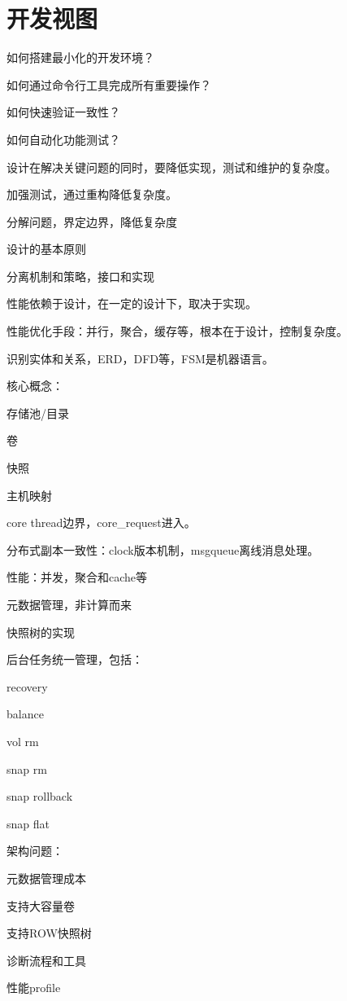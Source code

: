 \chapter{开发视图}

\begin{enumbox}
\item 如何搭建最小化的开发环境？
\item 如何通过命令行工具完成所有重要操作？
\item 如何快速验证一致性？
\item 如何自动化功能测试？
\end{enumbox}

设计在解决关键问题的同时，要降低实现，测试和维护的复杂度。

加强测试，通过重构降低复杂度。

分解问题，界定边界，降低复杂度

设计的基本原则

分离机制和策略，接口和实现

性能依赖于设计，在一定的设计下，取决于实现。

性能优化手段：并行，聚合，缓存等，根本在于设计，控制复杂度。

识别实体和关系，ERD，DFD等，FSM是机器语言。

核心概念：
\begin{compactenum}
\item 存储池/目录
\item 卷
\item 快照
\item 主机映射
\end{compactenum}

core thread边界，core\_request进入。

分布式副本一致性：clock版本机制，msgqueue离线消息处理。

性能：并发，聚合和cache等

元数据管理，非计算而来

快照树的实现

后台任务统一管理，包括：
\begin{compactenum}
\item recovery
\item balance
\item vol rm
\item snap rm
\item snap rollback
\item snap flat
\end{compactenum}

架构问题：
\begin{compactenum}
\item 元数据管理成本
\item 支持大容量卷
\item 支持ROW快照树
\item 诊断流程和工具
\item 性能profile
\end{compactenum}

